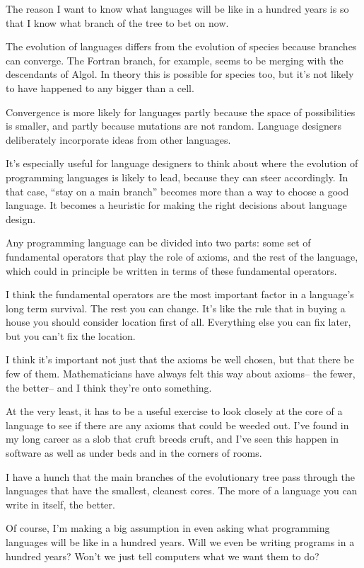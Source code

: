 The reason I want to know what languages will be like in a hundred years
is so that I know what branch of the tree to bet on now.

The evolution of languages differs from the evolution of species because
branches can converge. The Fortran branch, for example, seems to be
merging with the descendants of Algol. In theory this is possible for
species too, but it's not likely to have happened to any bigger than a
cell.

Convergence is more likely for languages partly because the space of
possibilities is smaller, and partly because mutations are not random.
Language designers deliberately incorporate ideas from other languages.

It's especially useful for language designers to think about where the
evolution of programming languages is likely to lead, because they can
steer accordingly. In that case, ``stay on a main branch'' becomes more
than a way to choose a good language. It becomes a heuristic for making
the right decisions about language design.

Any programming language can be divided into two parts: some set of
fundamental operators that play the role of axioms, and the rest of the
language, which could in principle be written in terms of these
fundamental operators.

I think the fundamental operators are the most important factor in a
language's long term survival. The rest you can change. It's like the
rule that in buying a house you should consider location first of all.
Everything else you can fix later, but you can't fix the location.

I think it's important not just that the axioms be well chosen, but that
there be few of them. Mathematicians have always felt this way about
axioms-- the fewer, the better-- and I think they're onto something.

At the very least, it has to be a useful exercise to look closely at the
core of a language to see if there are any axioms that could be weeded
out. I've found in my long career as a slob that cruft breeds cruft, and
I've seen this happen in software as well as under beds and in the
corners of rooms.

I have a hunch that the main branches of the evolutionary tree pass
through the languages that have the smallest, cleanest cores. The more
of a language you can write in itself, the better.

Of course, I'm making a big assumption in even asking what programming
languages will be like in a hundred years. Will we even be writing
programs in a hundred years? Won't we just tell computers what we want
them to do?

